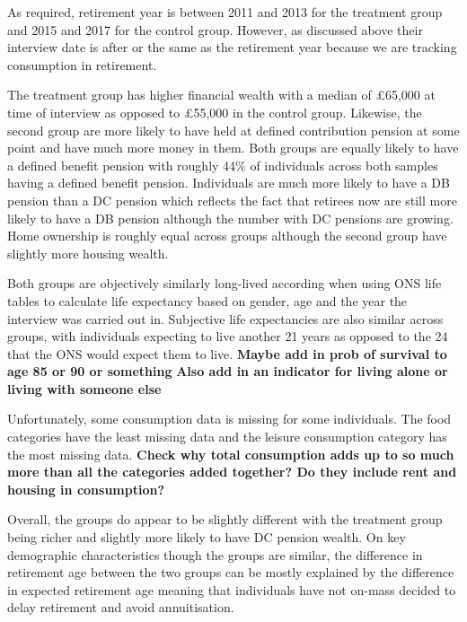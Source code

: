 \documentclass[12pt]{article}
\begin{document}
As required, retirement year is between 2011 and 2013 for the treatment group and 2015 and 2017 for the control group.
However, as discussed above their interview date is after or the same as the retirement year because we are tracking
consumption in retirement.

The treatment group has higher financial wealth with a median of £65,000 at time of interview as opposed to £55,000
in the control group. Likewise, the second group are more likely to have held at defined contribution pension at some point
and have much more money in them. Both groups are equally likely to have a defined benefit pension with roughly 44\% of
individuals across both samples having a defined benefit pension. Individuals are much more likely to have a DB pension
than a DC pension which reflects the fact that retirees now are still more likely to have a DB pension although the number
with DC pensions are growing. Home ownership is roughly equal across groups although the second group have slightly more
housing wealth.

Both groups are objectively similarly long-lived according when using ONS life tables to calculate life expectancy
based on gender, age and the year the interview was carried out in. Subjective life expectancies are also similar
across groups, with individuals expecting to live another 21 years as opposed to the 24 that the ONS would expect
them to live. \textbf{Maybe add in prob of survival to age 85 or 90 or something}
\textbf{Also add in an indicator for living alone or living with someone else}

Unfortunately, some consumption data is missing for some individuals. The food categories have the least missing data
and the leisure consumption category has the most missing data. \textbf{Check why total consumption adds up to so much
  more than all the categories added together? Do they include rent and housing in consumption?}


Overall, the groups do appear to be slightly different with the treatment group being richer and slightly more likely
to have DC pension wealth. On key demographic characteristics though the groups are similar, the difference in retirement
age between the two groups can be mostly explained by the difference in expected retirement age meaning that individuals
have not on-mass decided to delay retirement and avoid annuitisation.




\begin{landscape}

  

\end{landscape}
\end{document}
